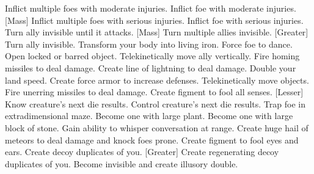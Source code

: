     {Inflict multiple foes with moderate injuries.}
    {Inflict foe with moderate injuries.}
[Mass]
    {Inflict multiple foes with serious injuries.}
    {Inflict foe with serious injuries.}
    {Turn ally invisible until it attacks.}
[Mass]
    {Turn multiple allies invisible.}
[Greater]
    {Turn ally invisible.}
    {Transform your body into living iron.}
    {Force foe to dance.}
    {Open locked or barred object.}
    {Telekinetically move ally vertically.}
    {Fire homing missiles to deal damage.}
    {Create line of lightning to deal damage.}
    {Double your land speed.}
    {Create force armor to increase defenses.}
    {Telekinetically move objects.}
    {Fire unerring missiles to deal damage.}
    {Create figment to fool all senses.}
[Lesser]
    {Know creature's next die results.}
    {Control creature's next die results.}
    {Trap foe in extradimensional maze.}
    {Become one with large plant.}
    {Become one with large block of stone.}
    {Gain ability to whisper conversation at range.}
    {Create huge hail of meteors to deal damage and knock foes prone.}
    {Create figment to fool eyes and ears.}
    {Create decoy duplicates of you.}
[Greater]
    {Create regenerating decoy duplicates of you.}
    {Become invisible and create illusory double.}
